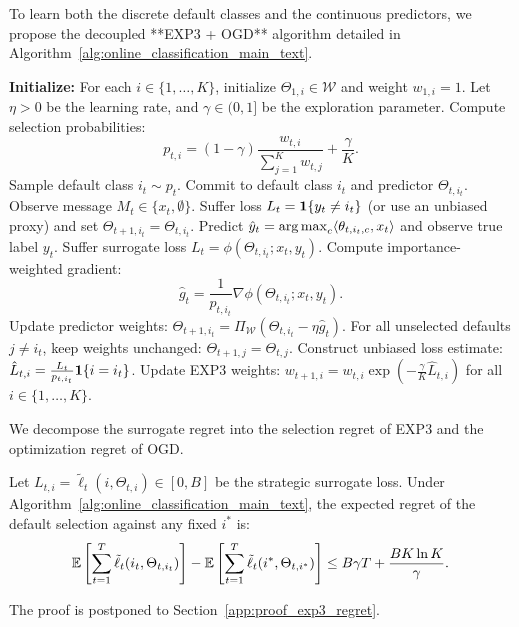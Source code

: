 To learn both the discrete default classes and the continuous predictors, we propose the decoupled **EXP3 + OGD** algorithm detailed in Algorithm~\ref{alg:online_classification_main_text}.

\begin{algorithm}[h]
\caption{Online Multiclass Classification with Strategic Withholding}
\label{alg:online_classification_main_text}
\begin{algorithmic}[1]
\State \textbf{Initialize:} For each $i \in \{1, \dots, K\}$, initialize $\Theta_{1,i} \in \mathcal{W}$ and weight $w_{1,i} = 1$. Let $\eta > 0$ be the learning rate, and $\gamma \in (0, 1]$ be the exploration parameter.
    \State Compute selection probabilities:
    \begin{equation*}
        p_{t,i} = (1-\gamma) \frac{w_{t,i}}{\sum_{j=1}^K w_{t,j}} + \frac{\gamma}{K}.
    \end{equation*}
    \State Sample default class $i_t \sim p_{t}$.
    \State Commit to default class $i_t$ and predictor $\Theta_{t, i_t}$.
    \State Observe message $M_t \in \{x_t, \emptyset\}$.
        \State Suffer loss $L_t = \mathbf{1}\{y_t \ne i_t\}$ (or use an unbiased proxy) and set $\Theta_{t+1, i_t} = \Theta_{t, i_t}$.
    \Else
        \State Predict $\hat{y}_t = \operatorname*{arg\,max}_c \langle \theta_{t,i_t, c}, x_t \rangle$ and observe true label $y_t$.
        \State Suffer surrogate loss $L_t = \phi(\Theta_{t, i_t}; x_t, y_t)$.
        \State Compute importance-weighted gradient:
        \begin{equation*}
            \hat{g}_t = \frac{1}{p_{t, i_t}} \nabla \phi(\Theta_{t, i_t}; x_t, y_t).
        \end{equation*}
        \State Update predictor weights: $\Theta_{t+1, i_t} = \Pi_{\mathcal{W}}\left( \Theta_{t, i_t} - \eta \hat{g}_t \right)$.
    \EndIf
    \State For all unselected defaults $j \ne i_t$, keep weights unchanged: $\Theta_{t+1, j} = \Theta_{t, j}$.
    \State Construct unbiased loss estimate: $\hat{L}_{t, i} = \frac{L_t}{p_{t, i_t}} \mathbf{1}\{i = i_t\}$.
    \State Update EXP3 weights: $w_{t+1, i} = w_{t, i} \exp\left(-\frac{\gamma}{K} \hat{L}_{t, i}\right)$ for all $i \in \{1, \dots, K\}$.
\EndFor
\end{algorithmic}
\end{algorithm}

We decompose the surrogate regret into the selection regret of EXP3 and the optimization regret of OGD.
\begin{lemma}
\label{lem:exp3_regret}
Let $L_{t, i} = \tilde{\ell}_t(i, \Theta_{t,i}) \in [0, B]$ be the strategic surrogate loss. Under Algorithm~\ref{alg:online_classification_main_text}, the expected regret of the default selection against any fixed $i^*$ is:
\begin{equation}
    \label{eq:exp3_regret}
    \mathbb{E}\left[ \sum_{t=1}^T \tilde{\ell}_t(i_t, \Theta_{t, i_t}) \right] - \mathbb{E}\left[ \sum_{t=1}^T \tilde{\ell}_t(i^*, \Theta_{t, i^*}) \right] \le B \gamma T + \frac{B K \ln K}{\gamma}.
\end{equation}
\end{lemma}
The proof is postponed to Section~\ref{app:proof_exp3_regret}.

